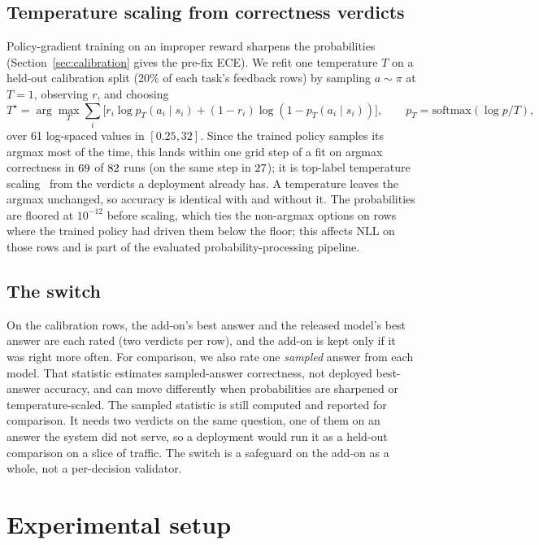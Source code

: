 \documentclass[11pt]{article}
\begin{document}
\subsection{Temperature scaling from correctness verdicts}
Policy-gradient training on an improper reward sharpens the probabilities (Section~\ref{sec:calibration} gives the pre-fix ECE). We refit one temperature $T$ on a held-out calibration split (20\% of each task's feedback rows) by sampling $a\sim\pi$ at $T=1$, observing $r$, and choosing
\begin{equation}
T^\star=\arg\max_T\sum_i\big[r_i\log p_T(a_i\mid s_i)+(1-r_i)\log(1-p_T(a_i\mid s_i))\big],\qquad p_T=\mathrm{softmax}(\log p/T),
\end{equation}
over 61 log-spaced values in $[0.25, 32]$. Since the trained policy samples its argmax most of the time, this lands within one grid step of a fit on argmax correctness in $69$ of $82$ runs (on the same step in $27$); it is top-label temperature scaling~\citep{gupta2022toplabel} from the verdicts a deployment already has. A temperature leaves the argmax unchanged, so accuracy is identical with and without it. The probabilities are floored at $10^{-12}$ before scaling, which ties the non-argmax options on rows where the trained policy had driven them below the floor; this affects NLL on those rows and is part of the evaluated probability-processing pipeline.

\subsection{The switch}
\label{sec:switch}
On the calibration rows, the add-on's best answer and the released model's best answer are each rated (two verdicts per row), and the add-on is kept only if it was right more often. For comparison, we also rate one \emph{sampled} answer from each model. That statistic estimates sampled-answer correctness, not deployed best-answer accuracy, and can move differently when probabilities are sharpened or temperature-scaled. The sampled statistic is still computed and reported for comparison. It needs two verdicts on the same question, one of them on an answer the system did not serve, so a deployment would run it as a held-out comparison on a slice of traffic. The switch is a safeguard on the add-on as a whole, not a per-decision validator.

\section{Experimental setup}
\label{sec:setup}
\end{document}
